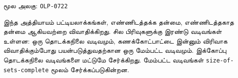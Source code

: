 \documentclass[11pt,a4paper,openany]{memoir}
\makeatletter
\newcommand\TADriverHeadingMode{\def\ol@chaptercs{section}\def\ol@partcs{section}}
\makeatother
\begin{document}

\OLEndPartHook


\endgroup

\clearpage
\noindent மூல அலகு: \texttt{OLP-0722}\par
\begingroup
\TADriverHeadingMode
{}




\begin{editorial}
இந்த அத்தியாயம் பட்டியலாக்கங்கள், எண்ணிடத்தக்க தன்மை,
எண்ணிடத்தகாத தன்மை ஆகியவற்றை விவாதிக்கிறது.
சில பிரிவுகளுக்கு இரண்டு வடிவங்கள் உள்ளன:
ஒரு தொடக்கநிலை வடிவமும், கணக்கோட்பாட்டை இன்னும்
விரிவாக விவாதிக்கும்போது பயன்படுத்துவதற்கான ஒரு மேம்பட்ட
வடிவமும். இக்கோப்பு தொடக்கநிலை வடிவங்களை மட்டுமே சேர்க்கிறது.
மேம்பட்ட வடிவங்கள் \verb|size-of-sets-complete| மூலம் சேர்க்கப்படுகின்றன.
\end{editorial}











\OLEndChapterHook



\endgroup


\nocite{Frege1953}


\end{document}
